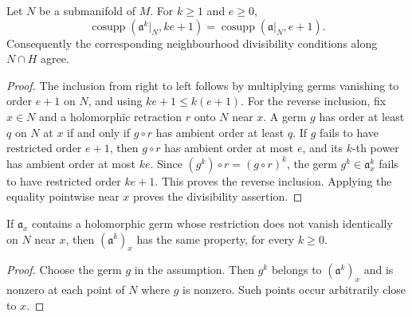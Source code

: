 \begin{lemma}
\label{hir:divisor-power-successor-threshold-along}
\leanok
Let $N$ be a submanifold of $M$. For $k\geq1$ and $e\geq0$,
\[
 \operatorname{cosupp}(\mathfrak a^k|_N,ke+1)
 =\operatorname{cosupp}(\mathfrak a|_N,e+1).
\]
Consequently the corresponding neighbourhood divisibility conditions
along $N\cap H$ agree.
\end{lemma}
\begin{proof}
The inclusion from right to left follows by multiplying germs vanishing
to order $e+1$ on $N$, and using $ke+1\leq k(e+1)$.
For the reverse inclusion, fix $x\in N$ and a holomorphic retraction
$r$ onto $N$ near $x$.  A germ $g$ has order at least $q$ on $N$ at
$x$ if and only if $g\circ r$ has ambient order at least $q$.
If $g$ fails to have restricted order $e+1$, then
$g\circ r$ has ambient order at most $e$, and its $k$-th power has
ambient order at most $ke$.  Since
$(g^k)\circ r=(g\circ r)^k$, the germ $g^k\in\mathfrak a^k_x$ fails
to have restricted order $ke+1$.  This proves the reverse inclusion.
Applying the equality pointwise near $x$ proves the divisibility assertion.
\end{proof}

\begin{lemma}
\label{hir:divisor-power-nonzero-along}
\leanok
If $\mathfrak a_x$ contains a holomorphic germ whose restriction does
not vanish identically on $N$ near $x$, then $(\mathfrak a^k)_x$ has
the same property, for every $k\geq0$.
\end{lemma}
\begin{proof}
Choose the germ $g$ in the assumption.  Then $g^k$ belongs to
$(\mathfrak a^k)_x$ and is nonzero at each point of $N$ where $g$ is
nonzero. Such points occur arbitrarily close to $x$.
\end{proof}

